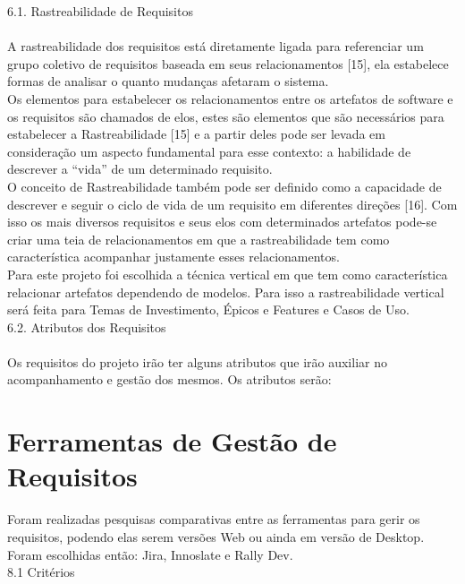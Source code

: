 {\large{6.1. Rastreabilidade de Requisitos}}\\ \\
\tab A rastreabilidade dos requisitos está diretamente ligada para referenciar um grupo coletivo de requisitos baseada em seus relacionamentos [15], ela estabelece formas de analisar o quanto mudanças afetaram o sistema.\\
\tab Os elementos para estabelecer os relacionamentos entre os artefatos de software e os requisitos são chamados de elos, estes são elementos que são necessários para estabelecer a Rastreabilidade [15] e a partir deles pode ser levada em consideração um aspecto fundamental para esse contexto: a habilidade de descrever a “vida” de um determinado requisito.\\
\tab O conceito de Rastreabilidade também pode ser definido como a capacidade de descrever e seguir o ciclo de vida de um requisito em diferentes direções [16]. Com isso os mais diversos requisitos e seus elos com determinados artefatos pode-se criar uma teia de relacionamentos em que a rastreabilidade tem como característica acompanhar justamente esses relacionamentos.\\
\tab Para este projeto foi escolhida a técnica vertical em que tem como característica relacionar artefatos dependendo de modelos. Para isso a rastreabilidade vertical será feita para Temas de Investimento, Épicos e Features e Casos de Uso.\\

{\large{6.2. Atributos dos Requisitos}}\\ \\
\tab Os requisitos do projeto irão ter alguns atributos que irão auxiliar no acompanhamento e gestão dos mesmos. Os atributos serão:\\




\section{Ferramentas de Gestão de Requisitos}
\label{sec}
\tab Foram realizadas pesquisas comparativas entre as ferramentas para gerir os requisitos, podendo elas serem versões Web ou ainda em versão de Desktop. Foram escolhidas então: Jira, Innoslate e Rally Dev.\\

{\large{8.1 Critérios}}\\


